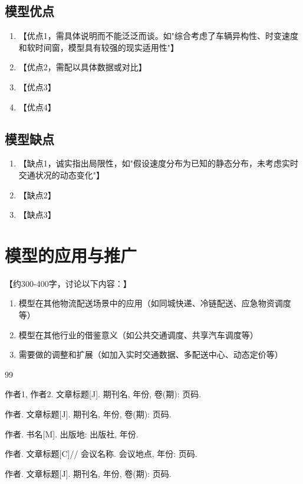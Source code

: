 \documentclass[12pt,letterpaper]{ctexart}
\numberwithin{equation}{section}
\numberwithin{figure}{section}
\numberwithin{table}{section}
\begin{document}
\subsection{模型优点}
\begin{enumerate}
    \item 【优点1，需具体说明而不能泛泛而谈。如"综合考虑了车辆异构性、时变速度和软时间窗，模型具有较强的现实适用性"】
    \item 【优点2，需配以具体数据或对比】
    \item 【优点3】
    \item 【优点4】
\end{enumerate}

\subsection{模型缺点}
\begin{enumerate}
    \item 【缺点1，诚实指出局限性，如"假设速度分布为已知的静态分布，未考虑实时交通状况的动态变化"】
    \item 【缺点2】
    \item 【缺点3】
\end{enumerate}

\section{模型的应用与推广}

【约300-400字，讨论以下内容：】
\begin{enumerate}
    \item 模型在其他物流配送场景中的应用（如同城快递、冷链配送、应急物资调度等）
    \item 模型在其他行业的借鉴意义（如公共交通调度、共享汽车调度等）
    \item 需要做的调整和扩展（如加入实时交通数据、多配送中心、动态定价等）
\end{enumerate}

\newpage
\begin{thebibliography}{99}

 作者1, 作者2. 文章标题[J]. 期刊名, 年份, 卷(期): 页码.

 作者. 文章标题[J]. 期刊名, 年份, 卷(期): 页码.

 作者. 书名[M]. 出版地: 出版社, 年份.

 作者. 文章标题[C]// 会议名称. 会议地点, 年份: 页码.

 作者. 文章标题[J]. 期刊名, 年份, 卷(期): 页码.

\end{thebibliography}
\end{document}
